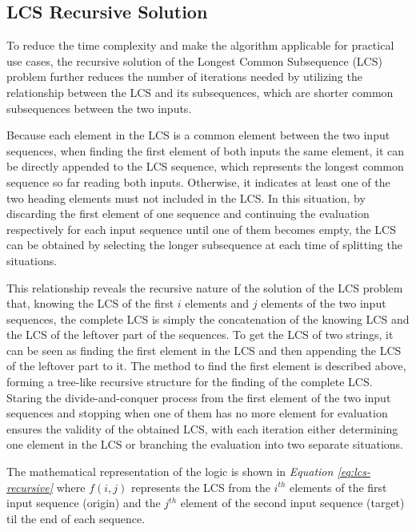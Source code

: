 \documentclass[sigplan,screen]{acmart}
\begin{document}

\subsection{LCS Recursive Solution}
\label{section:lcs-recursive}

To reduce the time complexity and make the algorithm applicable for practical use cases, the recursive solution of the Longest Common Subsequence (LCS) problem further reduces the number of iterations needed by utilizing the relationship between the LCS and its subsequences, which are shorter common subsequences between the two inputs. \cite{bergrothSurveyLongestCommon2000, hirschbergAlgorithmsLongestCommon1977, patersonLongestCommonSubsequences1994}

Because each element in the LCS is a common element between the two input sequences, when finding the first element of both inputs the same element, it can be directly appended to the LCS sequence, which represents the longest common sequence so far reading both inputs. \cite{bergrothSurveyLongestCommon2000} Otherwise, it indicates at least one of the two heading elements must not included in the LCS. In this situation, by discarding the first element of one sequence and continuing the evaluation respectively for each input sequence until one of them becomes empty, the LCS can be obtained by selecting the longer subsequence at each time of splitting the situations. \cite{bergrothSurveyLongestCommon2000}

This relationship reveals the recursive nature of the solution of the LCS problem that, knowing the LCS of the first $i$ elements and $j$ elements of the two input sequences, the complete LCS is simply the concatenation of the knowing LCS and the LCS of the leftover part of the sequences. To get the LCS of two strings, it can be seen as finding the first element in the LCS and then appending the LCS of the leftover part to it. The method to find the first element is described above, forming a tree-like recursive structure for the finding of the complete LCS. Staring the divide-and-conquer process from the first element of the two input sequences and stopping when one of them has no more element for evaluation ensures the validity of the obtained LCS, with each iteration either determining one element in the LCS or branching the evaluation into two separate situations.

The mathematical representation of the logic is shown in \textit{Equation \ref{eq:lcs-recursive}} where $f(i, j)$ represents the LCS from the $i^{th}$ elements of the first input sequence (origin) and the $j^{th}$ element of the second input sequence (target) til the end of each sequence.
\end{document}
